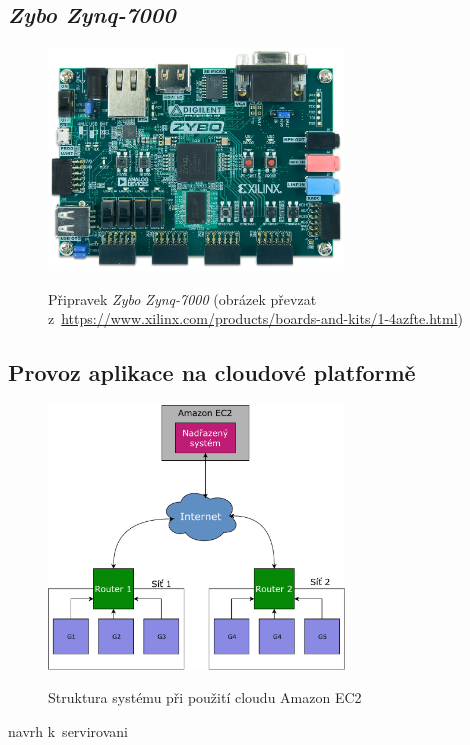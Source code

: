 \subsection{\textit{Zybo Zynq-7000}}
\label{sec:an_zyb}

\begin{figure}[h!]
    \centering
    \includegraphics[width=0.7\textwidth]{images/zybo.jpg}
    \label{fig:zybo}
    \caption[Přípravek \textit{Zybo Zynq-7000}]{Připravek \textit{Zybo Zynq-7000} (obrázek převzat z~\url{https://www.xilinx.com/products/boards-and-kits/1-4azfte.html})}
\end{figure}

\subsection{Provoz aplikace na cloudové platformě}
\label{sec:an_cloud}

\begin{figure}[h!]
    \centering
    \includegraphics[width=0.7\textwidth]{images/aws.pdf}
    \label{fig:aws}
    \caption{Struktura systému při použití cloudu Amazon EC2}
\end{figure}

navrh k~servirovani